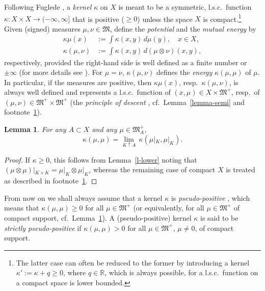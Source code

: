 \documentclass[12pt,a4paper,reqno]{amsart} %
\theoremstyle{lause}
\theoremstyle{maaritelma}
\theoremstyle{lause}
\newtheorem{lemma}[theorem]{Lemma}
\theoremstyle{maaritelma}
\numberwithin{equation}{section}
\begin{document}
Following Fuglede \cite{F1}, a {\it kernel\/} $\kappa$ on $X$ is meant to be a symmetric, l.s.c.\ function $\kappa:X\times X\to(-\infty,\infty]$ that is positive (${}\geqslant0$) unless the space $X$ is compact.\footnote{The latter case can often be reduced to the former by introducing a kernel $\kappa':=\kappa+q\geqslant0$, where $q\in\mathbb R$, which is always possible, for a l.s.c.\ function on a compact space is lower bounded.\label{fIII}}
Given (signed) measures $\mu,\nu\in\mathfrak M$, define the {\it potential\/} and the {\it mutual energy\/}  by
\begin{align*}\kappa\mu(x)&:=\int\kappa(x,y)\,d\mu(y),\quad x\in X,\\
\kappa(\mu,\nu)&:=\int\kappa(x,y)\,d(\mu\otimes\nu)(x,y),
\end{align*}
respectively, provided the right-hand side is well defined as a finite number or $\pm\infty$ (for more details see \cite[Section~2.1]{F1}). For $\mu=\nu$, $\kappa(\mu,\nu)$ defines the {\it energy\/} $\kappa(\mu,\mu)$ of $\mu$.
In particular, if the measures are positive, then $\kappa\mu(x)$, resp.\ $\kappa(\mu,\nu)$, is always well defined and represents a l.s.c.\ function of $(x,\mu)\in X\times\mathfrak M^+$, resp.\ of $(\mu,\nu)\in\mathfrak M^+\times\mathfrak M^+$ (the {\it principle of descent\/} \cite[Lemma~2.2.1]{F1}, cf.\ Lemma~\ref{lemma-semi} and footnote~\ref{fIII}).

\begin{lemma}\label{222} For any\/ $A\subset X$ and any\/ $\mu\in\mathfrak M^+_A$,
\begin{equation*}\label{emon}\kappa(\mu,\mu)=\lim_{K\uparrow A}\,\kappa(\mu|_K,\mu|_K).\end{equation*}
\end{lemma}

\begin{proof}
 If $\kappa\geqslant0$, this follows from Lemma~\ref{l-lower} noting that $(\mu\otimes\mu)|_{K\times K}=\mu|_K\otimes\mu|_K$, whereas the remaining case of compact $X$ is treated as described in footnote~\ref{fIII}.
\end{proof}

From now on we shall always assume that a kernel $\kappa$ is {\it pseudo-positive\/} \cite[p.~150]{F1}, which means that $\kappa(\mu,\mu)\geqslant0$ for all $\mu\in\mathfrak M^+$ (or equivalently, for all $\mu\in\mathfrak M^+$ of compact support, cf.\ Lemma~\ref{222}). A (pse\-udo-pos\-it\-ive) kernel $\kappa$ is said to be {\it strictly pse\-udo-pos\-itive\/} if $\kappa(\mu,\mu)>0$ for all $\mu\in\mathfrak M^+$, $\mu\ne0$, of compact support.
\end{document}
